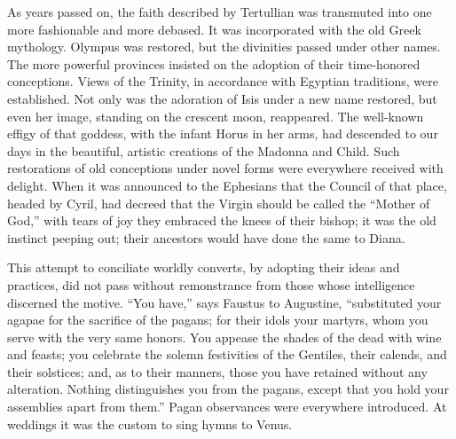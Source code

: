 As years passed on, the faith described by Tertullian was transmuted into one more
fashionable and more debased. It was incorporated with the old Greek mythology. Olympus
was restored, but the divinities passed under other names. The more powerful provinces
insisted on the adoption of their time-honored conceptions. Views of the Trinity, in
accordance with Egyptian traditions, were established. Not only was the adoration of Isis
under a new name restored, but even her image, standing on the crescent moon, reappeared.
The well-known effigy of that goddess, with the infant Horus in her arms, had descended to
our days in the beautiful, artistic creations of the Madonna and Child. Such restorations of
old conceptions under novel forms were everywhere received with delight. When it was
announced to the Ephesians that the Council of that place, headed by Cyril, had decreed that
the Virgin should be called the ``Mother of God,'' with tears of joy they embraced the knees
of their bishop; it was the old instinct peeping out; their ancestors would have done the same
to Diana.

This attempt to conciliate worldly converts, by adopting their ideas and practices, did not
pass without remonstrance from those whose intelligence discerned the motive. ``You have,''
says Faustus to Augustine, ``substituted your agapae for the sacrifice of the pagans; for their
idols your martyrs, whom you serve with the very same honors. You appease the shades of
the dead with wine and feasts; you celebrate the solemn festivities of the Gentiles, their
calends, and their solstices; and, as to their manners, those you have retained without any
alteration. Nothing distinguishes you from the pagans, except that you hold your assemblies
apart from them.'' Pagan observances were everywhere introduced. At weddings it was the
custom to sing hymns to Venus.

